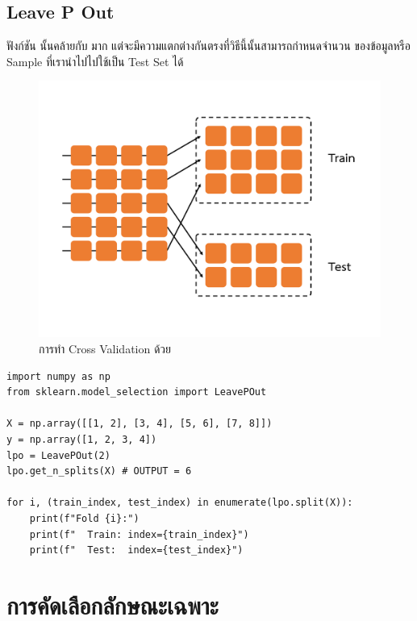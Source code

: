 \subsection{Leave P Out}
\label{ssec:leave_p_out}

ฟังก์ชัน  นั้นคล้ายกับ  มาก แต่จะมีความแตกต่างกันตรงที่วิธีนี้นั้นสามารถกำหนดจำนวน%
ของข้อมูลหรือ Sample ที่เรานำไปไปใช้เป็น Test Set ได้

\begin{figure}[H]
    \centering
    \includegraphics[width=0.9\linewidth,page=6]{fig/cross_validation.pdf}
    \caption{การทำ Cross Validation ด้วย }
    \label{fig:leave_p_out}
\end{figure}

\begin{lstlisting}[style=MyPython]
import numpy as np
from sklearn.model_selection import LeavePOut

X = np.array([[1, 2], [3, 4], [5, 6], [7, 8]])
y = np.array([1, 2, 3, 4])
lpo = LeavePOut(2)
lpo.get_n_splits(X) # OUTPUT = 6

for i, (train_index, test_index) in enumerate(lpo.split(X)):
    print(f"Fold {i}:")
    print(f"  Train: index={train_index}")
    print(f"  Test:  index={test_index}")
\end{lstlisting}

\section{การคัดเลือกลักษณะเฉพาะ}
\label{sec:select_feat}

